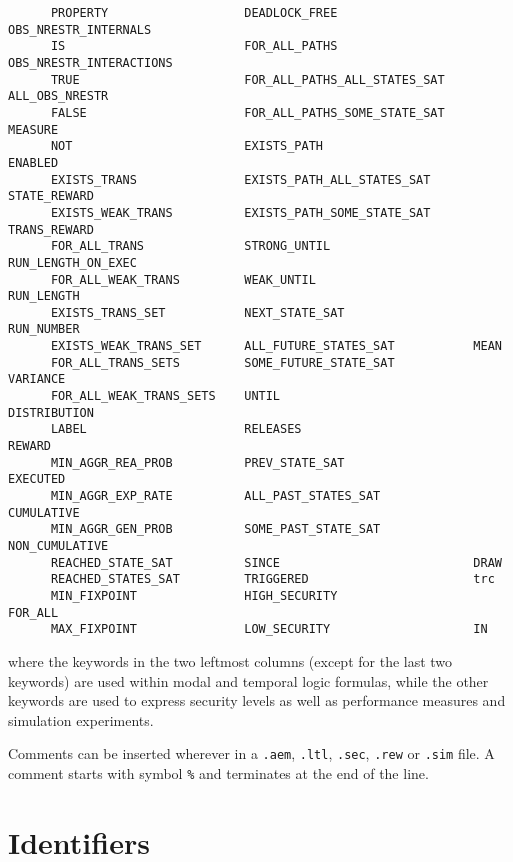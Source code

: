 	\begin{verbatim}
      PROPERTY                   DEADLOCK_FREE                   OBS_NRESTR_INTERNALS
      IS                         FOR_ALL_PATHS                   OBS_NRESTR_INTERACTIONS
      TRUE                       FOR_ALL_PATHS_ALL_STATES_SAT    ALL_OBS_NRESTR
      FALSE                      FOR_ALL_PATHS_SOME_STATE_SAT    MEASURE
      NOT                        EXISTS_PATH                     ENABLED
      EXISTS_TRANS               EXISTS_PATH_ALL_STATES_SAT      STATE_REWARD
      EXISTS_WEAK_TRANS          EXISTS_PATH_SOME_STATE_SAT      TRANS_REWARD
      FOR_ALL_TRANS              STRONG_UNTIL                    RUN_LENGTH_ON_EXEC
      FOR_ALL_WEAK_TRANS         WEAK_UNTIL                      RUN_LENGTH
      EXISTS_TRANS_SET           NEXT_STATE_SAT                  RUN_NUMBER
      EXISTS_WEAK_TRANS_SET      ALL_FUTURE_STATES_SAT           MEAN
      FOR_ALL_TRANS_SETS         SOME_FUTURE_STATE_SAT           VARIANCE
      FOR_ALL_WEAK_TRANS_SETS    UNTIL                           DISTRIBUTION
      LABEL                      RELEASES                        REWARD
      MIN_AGGR_REA_PROB          PREV_STATE_SAT                  EXECUTED
      MIN_AGGR_EXP_RATE          ALL_PAST_STATES_SAT             CUMULATIVE
      MIN_AGGR_GEN_PROB          SOME_PAST_STATE_SAT             NON_CUMULATIVE
      REACHED_STATE_SAT          SINCE                           DRAW
      REACHED_STATES_SAT         TRIGGERED                       trc
      MIN_FIXPOINT               HIGH_SECURITY                   FOR_ALL
      MAX_FIXPOINT               LOW_SECURITY                    IN
	\end{verbatim}

\noindent where the keywords in the two leftmost columns (except for the last two keywords) are used within
modal and temporal logic formulas, while the other keywords are used to express security levels as well as
performance measures and simulation experiments.

Comments can be inserted wherever in a {\tt .aem}, {\tt .ltl}, {\tt .sec}, {\tt .rew} or {\tt .sim} file. A
comment starts with symbol {\tt \%} and terminates at the end of the line.



\section{Identifiers}

